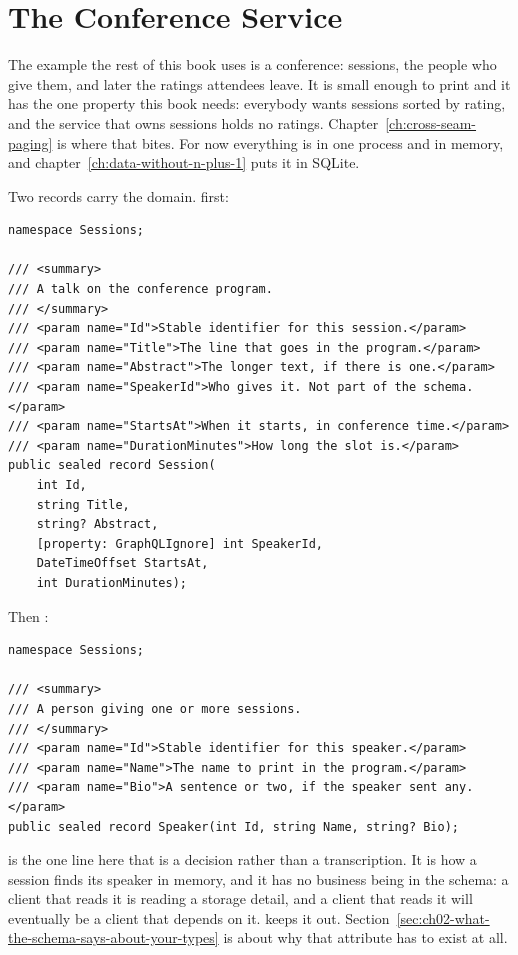 \section{The Conference Service}
\label{sec:ch02-the-conference-service}

The example the rest of this book uses is a conference: sessions, the people
who give them, and later the ratings attendees leave. It is small enough to
print and it has the one property this book needs: everybody wants sessions
sorted by rating, and the service that owns sessions holds no ratings.
Chapter~\ref{ch:cross-seam-paging} is where that bites. For now everything is
in one process and in memory, and chapter~\ref{ch:data-without-n-plus-1} puts
it in SQLite.

Two records carry the domain.  first:

\begin{verbatim}
namespace Sessions;

/// <summary>
/// A talk on the conference program.
/// </summary>
/// <param name="Id">Stable identifier for this session.</param>
/// <param name="Title">The line that goes in the program.</param>
/// <param name="Abstract">The longer text, if there is one.</param>
/// <param name="SpeakerId">Who gives it. Not part of the schema.</param>
/// <param name="StartsAt">When it starts, in conference time.</param>
/// <param name="DurationMinutes">How long the slot is.</param>
public sealed record Session(
    int Id,
    string Title,
    string? Abstract,
    [property: GraphQLIgnore] int SpeakerId,
    DateTimeOffset StartsAt,
    int DurationMinutes);
\end{verbatim}

Then :

\begin{verbatim}
namespace Sessions;

/// <summary>
/// A person giving one or more sessions.
/// </summary>
/// <param name="Id">Stable identifier for this speaker.</param>
/// <param name="Name">The name to print in the program.</param>
/// <param name="Bio">A sentence or two, if the speaker sent any.</param>
public sealed record Speaker(int Id, string Name, string? Bio);
\end{verbatim}

%
 is the one line here that is a decision rather than a
transcription. It is how a session finds its speaker in memory, and it has no
business being in the schema: a client that reads it is reading a storage
detail, and a client that reads it will eventually be a client that depends on
it.  keeps it out.
Section~\ref{sec:ch02-what-the-schema-says-about-your-types} is about why that
attribute has to exist at all.

